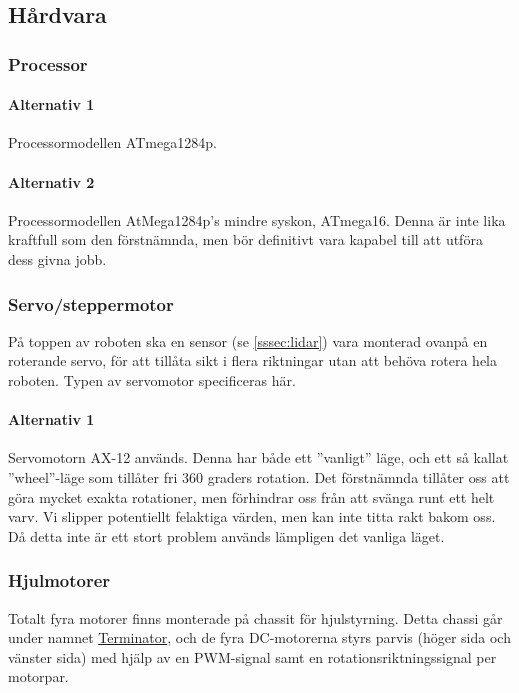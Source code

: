 \documentclass[a4paper,11pt]{article}
\begin{document}
\subsection{Hårdvara}

\subsubsection{Processor}

\paragraph{Alternativ 1}
Processormodellen ATmega1284p.

\paragraph{Alternativ 2}
Processormodellen AtMega1284p's mindre syskon, ATmega16. Denna är inte lika kraftfull som den förstnämnda, men bör definitivt vara kapabel till att utföra dess givna jobb.


\subsubsection{Servo/steppermotor} \label{ssec:servomotor}
På toppen av roboten ska en sensor (se \ref{sssec:lidar}) vara monterad ovanpå en roterande servo, för att tillåta sikt i flera riktningar utan att behöva rotera hela roboten. Typen av servomotor specificeras här.

\paragraph{Alternativ 1}
Servomotorn AX-12 används. Denna har både ett ''vanligt'' läge, och ett så kallat ''wheel''-läge som tillåter fri 360 graders rotation. Det förstnämnda tillåter oss att göra mycket exakta rotationer, men förhindrar oss från att svänga runt ett helt varv. Vi slipper potentiellt felaktiga värden, men kan inte titta rakt bakom oss. Då detta inte är ett stort problem används lämpligen det vanliga läget.

\subsubsection{Hjulmotorer}
Totalt fyra motorer finns monterade på chassit för hjulstyrning. Detta chassi går under namnet \href{https://docs.isy.liu.se/pub/VanHeden/DataSheets/terminator_prel.pdf}{Terminator}, och de fyra DC-motorerna styrs parvis (höger sida och vänster sida) med hjälp av en PWM-signal samt en rotationsriktningssignal per motorpar.
\end{document}
